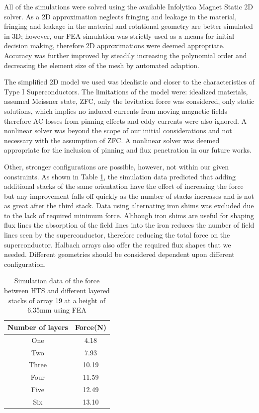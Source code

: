 All of the simulations were solved using the available Infolytica Magnet Static 2D solver. As a 2D approximation neglects fringing and leakage in the material, fringing and leakage in the material and rotational geometry are better simulated in 3D; however, our FEA simulation was strictly used as a means for initial decision making, therefore 2D approximations were deemed appropriate.   Accuracy was further improved by steadily increasing the polynomial order and decreasing the element size of the mesh by automated adaption. 

The simplified 2D model we used was idealistic and closer to the characteristics of Type I Superconductors.  The limitations of the model were: idealized materials, assumed Meissner state, ZFC, only the levitation force was considered, only static solutions, which implies no induced currents from moving magnetic fields therefore AC losses from pinning effects and eddy currents were also ignored. A nonlinear solver was beyond the scope of our initial considerations and not necessary with the assumption of ZFC.  A nonlinear solver was deemed appropriate for the inclusion of pinning and flux penetration in our future works.

Other, stronger configurations are possible, however, not within our given constraints. As shown in Table \ref{table_stacks}, the simulation data predicted that adding additional stacks of the same orientation have the effect of increasing the force but any improvement falls off quickly as the number of stacks increases and is not as great after the third stack. Data using alternating iron shims was excluded due to the lack of required minimum force.  Although iron shims are useful for shaping flux lines the absorption of the field lines into the iron reduces the number of field lines seen by the superconductor, therefore reducing the total force on the superconductor.  Halbach arrays also offer the required flux shapes that we needed.  Different geometries should be considered dependent upon different configuration.

\begin{table}[!t]
\caption{Simulation data of the force between HTS and different layered stacks of array 19 at a height of 6.35mm using FEA}
\label{table_stacks}
\centering
\begin{tabular}{cc}
\hline
Number of layers & Force(N) \\
\hline
One & 4.18\\
Two & 7.93\\
Three & 10.19\\
Four & 11.59\\
Five & 12.49\\
Six & 13.10\\
\hline
\end{tabular}
\end{table}

